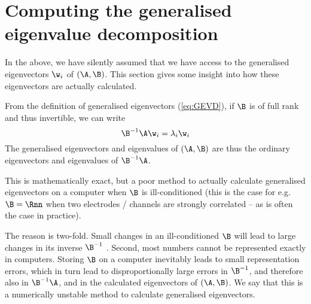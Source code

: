 
\section{Computing the generalised eigenvalue decomposition}


In the above, we have silently assumed that we have access to the generalised
eigenvectors $\w_i$ of $(\A, \B)$. This section gives some insight into how
these eigenvectors are actually calculated.

From the definition of generalised eigenvectors (\cref{eq:GEVD}), if $\B$ is
of full rank and thus invertible, we can write
\[
\B^{-1} \A \w_i = \lambda_i \w_i
\]
The generalised eigenvectors and eigenvalues of $(\A, \B)$ are thus the
ordinary eigenvectors and eigenvalues of $\B^{-1} \A$.

This is mathematically exact, but a poor method to actually calculate
generalised eigenvectors on a computer when $\B$ is
ill-conditioned\footnotemark{} (this is the case for e.g. $\B = \Rnn$ when
two electrodes / channels are strongly correlated -- as is often the case in
practice).

%

The reason is two-fold. Small changes in an ill-conditioned $\B$ will lead to
large changes in its inverse $\B^{-1}$ \cite{Trefethen1997,Golub2013}.
Second, most numbers cannot be represented exactly in
computers.\footnotemark{} Storing $\B$ on a computer inevitably leads to
small representation errors, which in turn lead to disproportionally large
errors in $\B^{-1}$, and therefore also in $\B^{-1}\A$, and in the calculated
eigenvectors of $(\A,\B)$. We say that this is a numerically unstable method
to calculate generalised eigenvectors.

